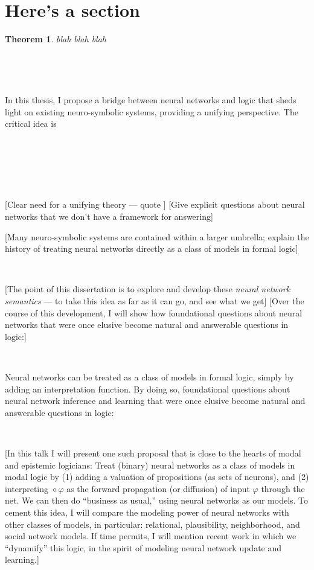 \documentclass{article}
\newcommand{\tmem}[1]{{\em #1\/}}
\newcommand{\tmtextbf}[1]{\text{{\bfseries{#1}}}}
\newtheorem{theorem}{Theorem}
\begin{document}
\section{Here's a section}

\begin{theorem}
  blah blah blah
\end{theorem}

\

\

In this thesis, I propose a bridge between neural networks and logic that
sheds light on existing neuro-symbolic systems, providing a unifying
perspective. The critical idea is

\

\

\

\hrulefill

[Clear need for a unifying theory --- quote {\cite{harmelen2022preface}}]
[Give explicit questions about neural networks that we don't have a framework
for answering]

[Many neuro-symbolic systems are contained within a larger umbrella; explain
the history of treating neural networks directly as a class of models in
formal logic]

\

\tmtextbf{Thesis:} [The point of this dissertation is to explore and develop
these {\tmem{neural network semantics}} --- to take this idea as far as it can
go, and see what we get] [Over the course of this development, I will show how
foundational questions about neural networks that were once elusive become
natural and answerable questions in logic:]

\

\tmtextbf{Thesis:} Neural networks can be treated as a class of models in
formal logic, simply by adding an interpretation function. By doing so,
foundational questions about neural network inference and learning that were
once elusive become natural and answerable questions in logic:

\

\tmtextbf{Talk Abstract:} [In this talk I will present one such proposal that
is close to the hearts of modal and epistemic logicians: Treat (binary) neural
networks as a class of models in modal logic by (1) adding a valuation of
propositions (as sets of neurons), and (2) interpreting $\diamond \varphi$ as
the forward propagation (or diffusion) of input $\varphi$ through the net. We
can then do ``business as usual,'' using neural networks as our models. To
cement this idea, I will compare the modeling power of neural networks with
other classes of models, in particular: relational, plausibility,
neighborhood, and social network models. If time permits, I will mention
recent work in which we ``dynamify'' this logic, in the spirit of modeling
neural network update and learning.]
\end{document}
